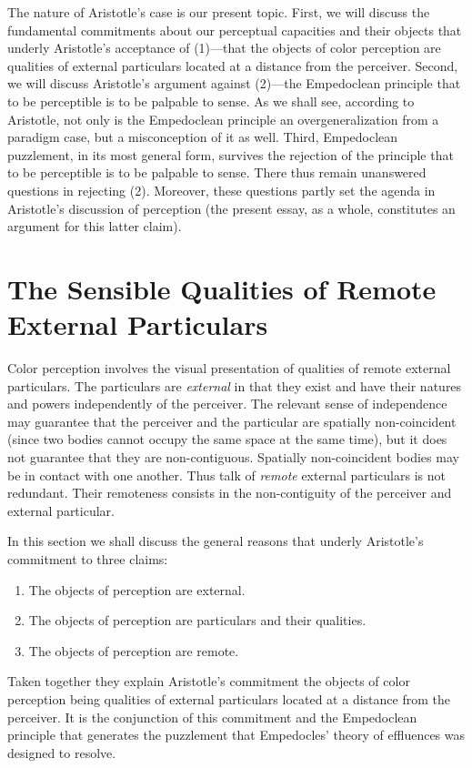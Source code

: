 The nature of Aristotle's case is our present topic. First, we will discuss the fundamental commitments about our perceptual capacities and their objects that underly Aristotle's acceptance of (1)---that the objects of color perception are qualities of external particulars located at a distance from the perceiver. Second, we will discuss Aristotle's argument against (2)---the Empedoclean principle that to be perceptible is to be palpable to sense. As we shall see, according to Aristotle, not only is the Empedoclean principle an overgeneralization from a paradigm case, but a misconception of it as well. Third, Empedoclean puzzlement, in its most general form, survives the rejection of the principle that to be perceptible is to be palpable to sense. There thus remain unanswered questions in rejecting (2). Moreover, these questions partly set the agenda in Aristotle's discussion of perception (the present essay, as a whole, constitutes an argument for this latter claim). 

\section{The Sensible Qualities of Remote External Particulars} %
\label{sec:sensible_qualities_of_remote_external_particulars}

Color perception involves the visual presentation of qualities of remote external particulars. The particulars are \emph{external} in that they exist and have their natures and powers independently of the perceiver. The relevant sense of independence may guarantee that the perceiver and the particular are spatially non-coincident (since two bodies cannot occupy the same space at the same time), but it does not guarantee that they are non-contiguous. Spatially non-coincident bodies may be in contact with one another. Thus talk of \emph{remote} external particulars is not redundant. Their remoteness consists in the non-contiguity of the perceiver and external particular.

In this section we shall discuss the general reasons that underly Aristotle's commitment to three claims:
\begin{enumerate}
    \item The objects of perception are external.
    \item The objects of perception are particulars and their qualities.
    \item The objects of perception are remote.
\end{enumerate}
Taken together they explain Aristotle's commitment the objects of color perception being qualities of external particulars located at a distance from the perceiver. It is the conjunction of this commitment and the Empedoclean principle that generates the puzzlement that Empedocles' theory of effluences was designed to resolve.

